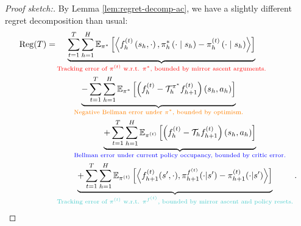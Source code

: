 \begin{proof}[Proof sketch:]
By Lemma \ref{lem:regret-decomp-ac}, we have a slightly different regret decomposition than usual:
    \begin{align}\label{eqn:nora-regret-decom}
    \operatorname{Reg}(T)
    = & \underbrace{\sum_{t=1}^T \sum_{h=1}^H \mathbb{E}_{\pi^*}\left[\left\langle f_h^{(t)}\left(s_h, \cdot\right), \pi_h^*\left(\cdot \mid s_h\right)-\pi_h^{(t)}\left(\cdot \mid s_h\right)\right\rangle\right]}_{\text{\textcolor{red}{Tracking error of $\pi^{(t)}$ w.r.t. $\pi^*$, bounded by mirror ascent arguments.}}} \nonumber\\ 
    &\qquad\underbrace{-\sum_{t=1}^T \sum_{h=1}^H\mathbb{E}_{\pi^*}\left[\left(f_h^{(t)}-\gT_h^{\pi^{*}}f_{h+1}^{(t)}\right)\left(s_h, a_h\right)\right]}_{\text{\textcolor{orange}{Negative Bellman error under $\pi^*$, bounded by optimism.}}} \nonumber\\
    &\qquad\underbrace{+ \sum_{t=1}^T \sum_{h=1}^H\mathbb{E}_{\pi^{(t)}}\left[\left(f_h^{(t)}-\gT_h f_{h+1}^{(t)}\right)\left(s_h, a_h\right)\right]}_{\text{\textcolor{blue}{Bellman error under current policy occupancy, bounded by critic error.}}}\nonumber\\
    &\underbrace{+\sum_{t=1}^T \sum_{h=1}^H \mathbb{E}_{\pi^{(t)}}\left[\left\langle f_{h+1}^{(t)}(s', \cdot), \pi_{h+1}^{f^{(t)}}(\cdot | s')-\pi_{h+1}^{(t)}(\cdot | s')\right\rangle\right]}_{\text{\textcolor{teal}{Tracking error of $\pi^{(t)}$ w.r.t. $\pi^{f^{(t)}}$, bounded by mirror ascent and policy resets.}}}.
\end{align}


\end{proof}
